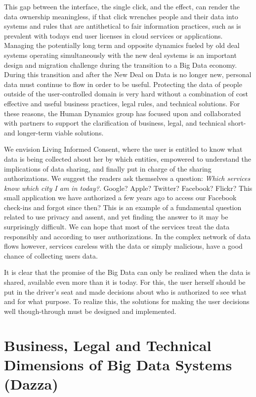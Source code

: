 This gap between the interface, the single click, and the effect, can render the data ownership meaningless, if that click wrenches people and their data into systems and rules that are antithetical to fair information practices, such as is prevalent with todays end user licenses in cloud services or applications.
Managing the potentially long term and opposite dynamics fueled by old deal systems operating simultaneously with the new deal systems is an important design and migration challenge during the transition to a Big Data economy.
During this transition and after the New Deal on Data is no longer new, personal data must continue to flow in order to be useful.
Protecting the data of people outside of the user-controlled domain is very hard without a combination of cost effective and useful business practices, legal rules, and technical solutions.
For these reasons, the Human Dynamics group has focused upon and collaborated with partners to support the clarification of business, legal, and technical short- and longer-term viable solutions.

We envision Living Informed Consent, where the user is entitled to know what data is being collected about her by which entities, empowered to understand the implications of data sharing, and finally put in charge of the sharing authorizations.
We suggest the readers ask themselves a question: \emph{Which services know which city I am in today?}.
Google? Apple? Twitter? Facebook? Flickr?
This small application we have authorized a few years ago to access our Facebook check-ins and forgot since then? 
This is an example of a fundamental question related to use privacy and assent, and yet finding the answer to it may be surprisingly difficult.
We can hope that most of the services treat the data responsibly and according to user authorizations.
In the complex network of data flows however, services careless with the data or simply malicious, have a good chance of collecting users data.

It is clear that the promise of the Big Data can only be realized when the data is shared, available even more than it is today.
For this, the user herself should be put in the driver's seat and made decisions about who is authorized to see what and for what purpose.
To realize this, the solutions for making the user decisions well though-through must be designed and implemented.



\section{Business, Legal and Technical Dimensions of Big Data Systems (Dazza)}

